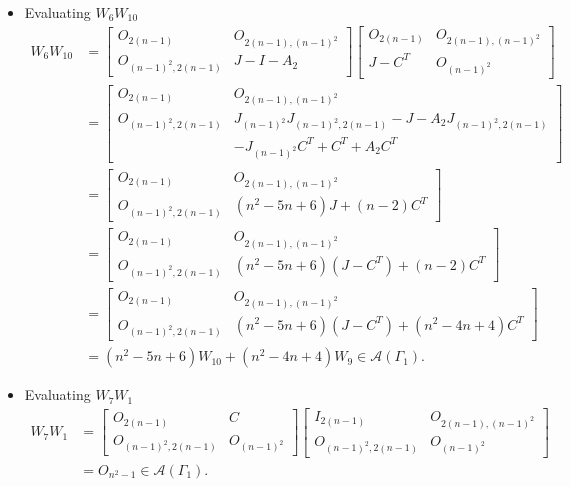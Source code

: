 \begin{itemize}
    \item Evaluating $W_6W_{10}$
    \begin{align*}
        W_6W_{10}
        &= \begin{bmatrix}
            O_{2(n-1)} & O_{2(n-1), (n-1)^2} \\
            O_{(n-1)^2, 2(n-1)} & J-I-A_2
        \end{bmatrix}\begin{bmatrix}
            O_{2(n-1)} & O_{2(n-1), (n-1)^2} \\
            J-C^T & O_{(n-1)^2}
        \end{bmatrix}\\
        &= \begin{bmatrix}
            O_{2(n-1)} & O_{2(n-1), (n-1)^2} \\
            O_{(n-1)^2, 2(n-1)} & J_{(n-1)^2}J_{(n-1)^2, 2(n-1)}-J-A_2J_{(n-1)^2, 2(n-1)}\\&- J_{(n-1)^2}C^T+C^T+A_2C^T
        \end{bmatrix}\\
        &= \begin{bmatrix}
            O_{2(n-1)} & O_{2(n-1), (n-1)^2} \\
            O_{(n-1)^2, 2(n-1)} & (n^2-5n+6)J + (n-2)C^T
        \end{bmatrix}\\
        &= \begin{bmatrix}
            O_{2(n-1)} & O_{2(n-1), (n-1)^2} \\
            O_{(n-1)^2, 2(n-1)} & (n^2-5n+6)(J-C^T) + (n-2)C^T
        \end{bmatrix}\\
        &= \begin{bmatrix}
            O_{2(n-1)} & O_{2(n-1), (n-1)^2} \\
            O_{(n-1)^2, 2(n-1)} & (n^2-5n+6)(J-C^T) + (n^2-4n+4)C^T
        \end{bmatrix}\\
        &=(n^2-5n+6)W_{10} + (n^2-4n+4)W_9\in\mathcal{A}(\Gamma_1).
    \end{align*}
    
    \item Evaluating $W_7W_1$
    \begin{align*}
        W_7W_1
        &= \begin{bmatrix}
            O_{2(n-1)} & C \\
            O_{(n-1)^2, 2(n-1)} & O_{(n-1)^2}
        \end{bmatrix}\begin{bmatrix}
            I_{2(n-1)} & O_{2(n-1), (n-1)^2} \\
            O_{(n-1)^2, 2(n-1)} & O_{(n-1)^2}
        \end{bmatrix}\\
        &= O_{n^2-1}\in\mathcal{A}(\Gamma_1).
    \end{align*}
    

\end{itemize}
